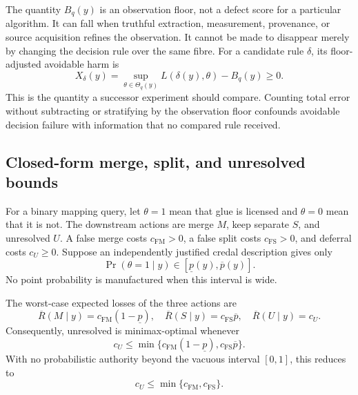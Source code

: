 The quantity $B_q(y)$ is an observation floor, not a defect score for a
particular algorithm. It can fall when truthful extraction, measurement,
provenance, or source acquisition refines the observation. It cannot be made
to disappear merely by changing the decision rule over the same fibre. For a
candidate rule $\delta$, its floor-adjusted avoidable harm is
\begin{equation}
 X_\delta(y)=
 \sup_{\theta\in\Theta_q(y)}L(\delta(y),\theta)-B_q(y)\geq 0.
 \label{eq:excess-harm}
\end{equation}
This is the quantity a successor experiment should compare. Counting total
error without subtracting or stratifying by the observation floor confounds
avoidable decision failure with information that no compared rule received.

\subsection{Closed-form merge, split, and unresolved bounds}

For a binary mapping query, let $\theta=1$ mean that glue is licensed and
$\theta=0$ mean that it is not. The downstream actions are merge $M$, keep
separate $S$, and unresolved $U$. A false merge costs $c_{\mathrm{FM}}>0$, a
false split costs $c_{\mathrm{FS}}>0$, and deferral costs $c_U\geq0$.
Suppose an independently justified credal description gives only
\begin{equation}
  \Pr(\theta=1\mid y)\in[\underline p(y),\overline p(y)].
\end{equation}
No point probability is manufactured when this interval is wide.

\begin{proposition}
\label{prop:binary-bound}
The worst-case expected losses of the three actions are
\begin{equation}
 \overline R(M\mid y)=c_{\mathrm{FM}}(1-\underline p),\quad
 \overline R(S\mid y)=c_{\mathrm{FS}}\overline p,\quad
 \overline R(U\mid y)=c_U.
 \label{eq:binary-risk}
\end{equation}
Consequently, unresolved is minimax-optimal whenever
\begin{equation}
 c_U\leq
 \min\{c_{\mathrm{FM}}(1-\underline p),
       c_{\mathrm{FS}}\overline p\}.
 \label{eq:defer-bound}
\end{equation}
With no probabilistic authority beyond the vacuous interval $[0,1]$, this
reduces to
\[
 c_U\leq\min\{c_{\mathrm{FM}},c_{\mathrm{FS}}\}.
\]
\end{proposition}

